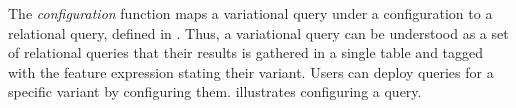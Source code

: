 %
The \emph{configuration} function maps a variational query under
a configuration
to a relational query, defined in . Thus, a variational query 
can be understood as a set of relational queries that their results is gathered
in a single table and tagged with the feature expression stating their variant.
%
Users can deploy queries for a specific variant by configuring 
them.
 illustrates configuring a query.


%

